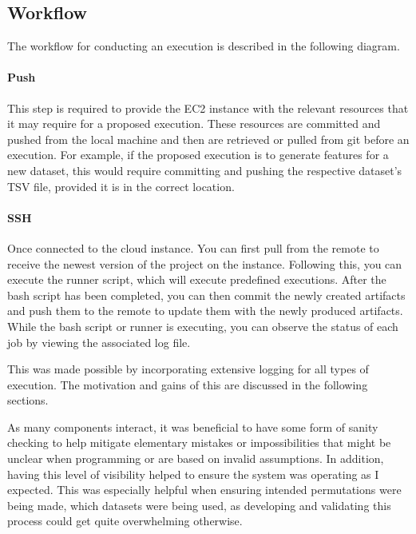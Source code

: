 \subsection{Workflow}
The workflow for conducting an execution is described in the following diagram.


\paragraph{Push}
This step is required to provide the EC2 instance with the relevant resources that it may require for a proposed execution. These resources are committed and pushed from the local machine and then are retrieved or pulled from git before an execution. For example, if the proposed execution is to generate features for a new dataset, this would require committing and pushing the respective dataset's TSV file, provided it is in the correct location.

\paragraph{SSH} Once connected to the cloud instance. You can first pull from the remote to receive the newest version of the project on the instance. Following this, you can execute the runner script, which will execute predefined executions. After the bash script has been completed, you can then commit the newly created artifacts and push them to the remote to update them with the newly produced artifacts. While the bash script or runner is executing, you can observe the status of each job by viewing the associated log file. 

This was made possible by incorporating extensive logging for all types of execution. The motivation and gains of this are discussed in the following sections.

As many components interact, it was beneficial to have some form of sanity checking to help mitigate elementary mistakes or impossibilities that might be unclear when programming or are based on invalid assumptions. In addition, having this level of visibility helped to ensure the system was operating as I expected. This was especially helpful when ensuring intended permutations were being made, which datasets were being used, as developing and validating this process could get quite overwhelming otherwise.

